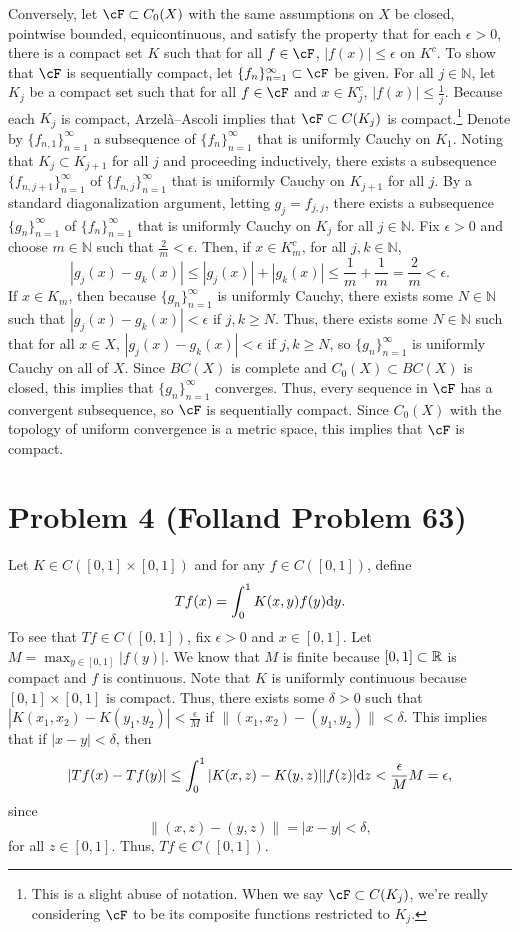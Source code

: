 \documentclass{article}
\begin{document}
Conversely, let $\cF\subset C_0(X)$ with the same assumptions on $X$ be closed, pointwise bounded, equicontinuous, and satisfy the property that for each $\epsilon>0$, there is a compact set $K$ such that for all $f\in\cF$, $|f(x)|\leq\epsilon$ on $K^c$. To show that $\cF$ is sequentially compact, let $\{f_n\}_{n=1}^\infty\subset\cF$ be given. For all $j\in\mathbb{N}$, let $K_j$ be a compact set such that for all $f\in\cF$ and $x\in K^c_j$, $|f(x)|\leq\frac{1}{j}$. Because each $K_j$ is compact, Arzel\`a--Ascoli implies that $\cF\subset C(K_j)$ is compact.\footnote{This is a slight abuse of notation. When we say $\cF\subset C(K_j)$, we're really considering $\cF$ to be its composite functions restricted to $K_j$.} Denote by $\{f_{n,1}\}_{n=1}^\infty$ a subsequence of $\{f_n\}_{n=1}^\infty$ that is uniformly Cauchy on $K_1$. Noting that $K_{j}\subset K_{j+1}$ for all $j$ and proceeding inductively, there exists a subsequence $\{f_{n,j+1}\}_{n=1}^\infty$ of $\{f_{n,j}\}_{n=1}^\infty$ that is uniformly Cauchy on $K_{j+1}$ for all $j$. By a standard diagonalization argument, letting $g_j=f_{j,j}$, there exists a subsequence $\{g_n\}_{n=1}^\infty$ of $\{f_n\}_{n=1}^\infty$ that is uniformly Cauchy on $K_j$ for all $j\in\mathbb{N}$. Fix $\epsilon>0$ and choose $m\in\mathbb{N}$ such that $\frac{2}{m}<\epsilon$. Then, if $x\in K^c_m$, for all $j,k\in\mathbb{N}$, 
\[
|g_j(x)-g_k(x)|\leq|g_j(x)|+|g_k(x)|\leq\frac{1}{m}+\frac{1}{m}=\frac{2}{m}<\epsilon.
\]
If $x\in K_m$, then because $\{g_n\}_{n=1}^\infty$ is uniformly Cauchy, there exists some $N\in\mathbb{N}$ such that $|g_j(x)-g_k(x)|<\epsilon$ if $j,k\geq N$. Thus, there exists some $N\in\mathbb{N}$ such that for all $x\in X$, $|g_j(x)-g_k(x)|<\epsilon$ if $j,k\geq N$, so $\{g_n\}_{n=1}^\infty$ is uniformly Cauchy on all of $X$. Since $BC(X)$ is complete and $C_0(X)\subset BC(X)$ is closed, this implies that $\{g_n\}_{n=1}^\infty$ converges. Thus, every sequence in $\cF$ has a convergent subsequence, so $\cF$ is sequentially compact. Since $C_0(X)$ with the topology of uniform convergence is a metric space, this implies that $\cF$ is compact.

\section{Problem 4 (Folland Problem 63)}
Let $K\in C([0,1]\times[0,1])$ and for any $f\in C([0,1])$, define
\[
Tf(x)=\int_{0}^{1}K(x,y)f(y)\mathrm{d} y.
\]
To see that $Tf\in C([0,1])$, fix $\epsilon>0$ and $x\in[0,1]$. Let $M=\max_{y\in[0,1]}|f(y)|$. We know that $M$ is finite because $[0,1]\subset\mathbb{R}$ is compact and $f$ is continuous. Note that $K$ is uniformly continuous because $[0,1]\times[0,1]$ is compact. Thus, there exists some $\delta>0$ such that $|K(x_1,x_2)-K(y_1,y_2)|<\frac{\epsilon}{M}$ if $\|(x_1,x_2)-(y_1,y_2)\|<\delta$. This implies that if $|x-y|<\delta$, then
\begin{align*}
|Tf(x)-Tf(y)|\leq\int_0^1|K(x,z)-K(y,z)||f(z)|\mathrm{d} z<\frac{\epsilon}{M}M=\epsilon,
\end{align*}
since
\[
\|(x,z)-(y,z)\|=|x-y|<\delta,
\]
for all $z\in[0,1]$. Thus, $Tf\in C([0,1])$. 
\end{document}
